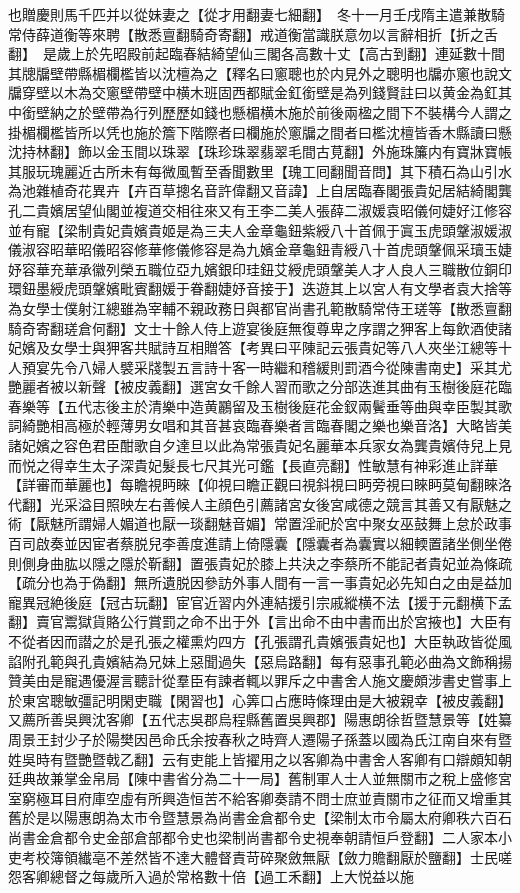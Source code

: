 也贈慶則馬千匹并以從妹妻之【從才用翻妻七細翻】　冬十一月壬戌隋主遣兼散騎常侍薛道衡等來聘【散悉亶翻騎奇寄翻】戒道衡當識朕意勿以言辭相折【折之舌翻】　是歲上於先昭殿前起臨春結綺望仙三閣各高數十丈【高古到翻】連延數十間其牕牖壁帶縣楣欄檻皆以沈檀為之【釋名曰窻聰也於内見外之聰明也牖亦窻也說文牖穿壁以木為交窻壁帶壁中横木班固西都賦金釭銜壁是為列錢賢註曰以黄金為釭其中銜壁納之於壁帶為行列歷歷如錢也懸楣横木施於前後兩楹之間下不裝構今人謂之掛楣欄檻皆所以凭也施於簷下階際者曰欄施於窻牖之間者曰檻沈檀皆香木縣讀曰懸沈持林翻】飾以金玉間以珠翠【珠珍珠翠翡翠毛間古莧翻】外施珠簾内有寶牀寶帳其服玩瑰麗近古所未有每微風暫至香聞數里【瑰工囘翻聞音問】其下積石為山引水為池雜植奇花異卉【卉百草摠名音許偉翻又音諱】上自居臨春閣張貴妃居結綺閣龔孔二貴嬪居望仙閣並複道交相往來又有王李二美人張薛二淑媛袁昭儀何婕好江修容並有寵【梁制貴妃貴嬪貴姬是為三夫人金章龜鈕紫綬八十首佩于寘玉虎頭鞶淑媛淑儀淑容昭華昭儀昭容修華修儀修容是為九嬪金章龜鈕青綬八十首虎頭鞶佩采瓄玉婕妤容華充華承徽列榮五職位亞九嬪銀印珪鈕艾綬虎頭鞶美人才人良人三職散位銅印環鈕墨綬虎頭鞶嬪毗賓翻媛于眷翻婕妤音接于】迭遊其上以宮人有文學者袁大捨等為女學士僕射江總雖為宰輔不親政務日與都官尚書孔範散騎常侍王瑳等【散悉亶翻騎奇寄翻瑳倉何翻】文士十餘人侍上遊宴後庭無復尊卑之序謂之狎客上每飲酒使諸妃嬪及女學士與狎客共賦詩互相贈答【考異曰平陳記云張貴妃等八人夾坐江總等十人預宴先令八婦人襞采牋製五言詩十客一時繼和稽緩則罰酒今從陳書南史】采其尤艷麗者被以新聲【被皮義翻】選宮女千餘人習而歌之分部迭進其曲有玉樹後庭花臨春樂等【五代志後主於清樂中造黄鸝留及玉樹後庭花金釵兩鬢垂等曲與幸臣製其歌詞綺艷相高極於輕薄男女唱和其音甚哀臨春樂者言臨春閣之樂也樂音洛】大略皆美諸妃嬪之容色君臣酣歌自夕達旦以此為常張貴妃名麗華本兵家女為龔貴嬪侍兒上見而悦之得幸生太子深貴妃髮長七尺其光可鑑【長直亮翻】性敏慧有神彩進止詳華【詳審而華麗也】每瞻視眄睞【仰視曰瞻正觀曰視斜視曰眄旁視曰睞眄莫甸翻睞洛代翻】光采溢目照映左右善候人主顔色引薦諸宮女後宮咸德之競言其善又有厭魅之術【厭魅所謂婦人媚道也厭一琰翻魅音媚】常置淫祀於宮中聚女巫鼓舞上怠於政事百司啟奏並因宦者蔡脱兒李善度進請上倚隱囊【隱囊者為囊實以細輭置諸坐側坐倦則側身曲肱以隱之隱於靳翻】置張貴妃於膝上共決之李蔡所不能記者貴妃並為條疏【疏分也為于偽翻】無所遺脱因參訪外事人間有一言一事貴妃必先知白之由是益加寵異冠絶後庭【冠古玩翻】宦官近習内外連結援引宗戚縱横不法【援于元翻横下孟翻】賣官鬻獄貨賂公行賞罰之命不出于外【言出命不由中書而出於宮掖也】大臣有不從者因而譛之於是孔張之權熏灼四方【孔張謂孔貴嬪張貴妃也】大臣執政皆從風諂附孔範與孔貴嬪結為兄妹上惡聞過失【惡烏路翻】每有惡事孔範必曲為文飾稱揚贊美由是寵遇優渥言聽計從羣臣有諫者輒以罪斥之中書舍人施文慶頗涉書史嘗事上於東宮聰敏彊記明閑吏職【閑習也】心筭口占應時條理由是大被親幸【被皮義翻】又薦所善吳興沈客卿【五代志吳郡烏程縣舊置吳興郡】陽惠朗徐哲暨慧景等【姓纂周景王封少子於陽樊因邑命氏余按春秋之時齊人遷陽子孫蓋以國為氏江南自來有暨姓吳時有暨艷暨戟乙翻】云有吏能上皆擢用之以客卿為中書舍人客卿有口辯頗知朝廷典故兼掌金帛局【陳中書省分為二十一局】舊制軍人士人並無關市之稅上盛修宮室窮極耳目府庫空虛有所興造恒苦不給客卿奏請不問士庶並責關市之征而又增重其舊於是以陽惠朗為太市令暨慧景為尚書金倉都令史【梁制太市令屬太府卿秩六百石尚書金倉都令史金部倉部都令史也梁制尚書都令史視奉朝請恒戶登翻】二人家本小吏考校簿領纎亳不差然皆不達大體督責苛碎聚斂無厭【斂力贍翻厭於鹽翻】士民嗟怨客卿總督之每歲所入過於常格數十倍【過工禾翻】上大悦益以施
